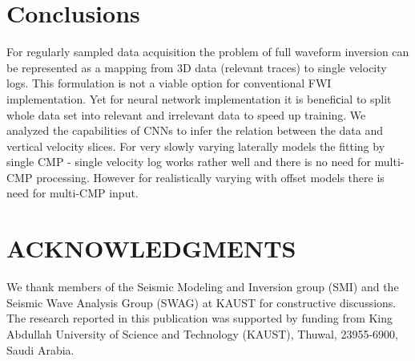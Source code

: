 \documentclass[manuscript]{geophysics}
\begin{document}
\section{Conclusions}
For regularly sampled data acquisition the problem of full waveform inversion can be represented as a mapping from 3D data (relevant traces) to single velocity logs. This formulation is not a viable option for conventional FWI implementation. Yet for neural network implementation it is benefiсial to split whole data set into relevant and irrelevant data to speed up training.  
We analyzed the capabilities of CNNs to infer the relation between the data and vertical velocity slices. For very slowly varying laterally models the fitting by single CMP - single velocity log works rather well and there is no need for multi-CMP processing. However for realistically varying with offset models there is need for multi-CMP input. 


\section{ACKNOWLEDGMENTS}

We thank members of the Seismic Modeling and Inversion group (SMI) and the Seismic Wave Analysis Group (SWAG) at KAUST for constructive discussions.
The research reported in this publication was supported by funding from King Abdullah University of Science and Technology (KAUST), Thuwal, 23955-6900, Saudi Arabia.




\newpage


\end{document}
